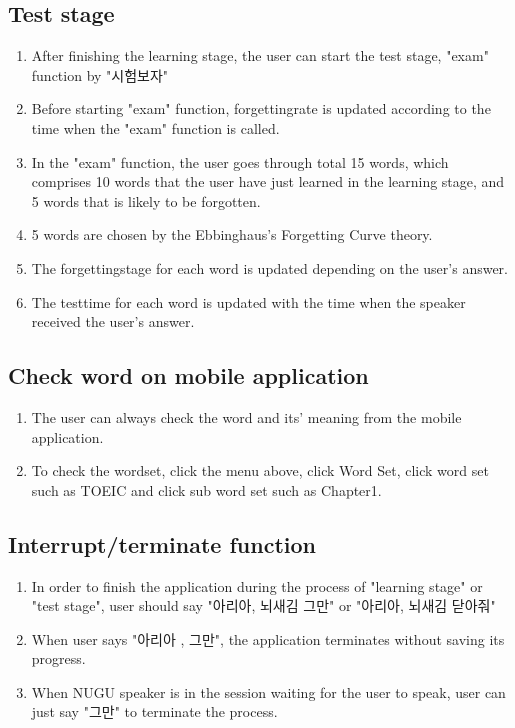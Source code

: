\documentclass[conference]{IEEEtran}
\begin{document}
    \subsection{Test stage}
        \begin{enumerate}
        \item After finishing the learning stage, the user can start the test stage, "exam" function by "시험보자"
        \item Before starting "exam" function, forgettingrate is updated according to the time when the "exam" function is called.
        \item In the "exam" function, the user goes through total 15 words, which comprises 10 words that the user have just learned in the learning stage, and 5 words that is likely to be forgotten.
        \item 5 words are chosen by the Ebbinghaus's Forgetting Curve theory.
        \item The forgettingstage for each word is updated depending on the user's answer.
        \item The testtime for each word is updated with the time when the speaker received the user's answer.
        \end{enumerate}
    
    \subsection{Check word on mobile application}
    \begin{enumerate}
        \item The user can always check the word and its' meaning from the mobile application.
        \item To check the wordset, click the menu above, click  Word Set, click word set such as TOEIC and click sub word set such as Chapter1.
    \end{enumerate}
    \subsection{Interrupt/terminate function}
        \begin{enumerate}
        \item In order to finish the application during the process of "learning stage" or "test stage", user should say "아리아, 뇌새김 그만" or "아리아, 뇌새김 닫아줘"
        \item When user says "아리아 , 그만", the application terminates without saving its progress.
        \item When NUGU speaker is in the session waiting for the user to speak, user can just say "그만" to terminate the process.
        \end{enumerate}
\end{document}
